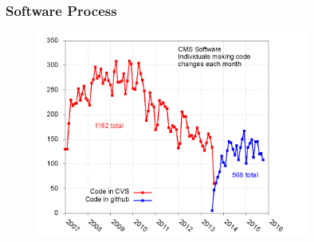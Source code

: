 \begin{frame}
\frametitle{Software Process}

\begin{figure}[htbp]
\begin{center}
\includegraphics[width=0.8\textwidth]{images/cmssw-authors-per-month.png}
\end{center}
\end{figure}

\end{frame}



